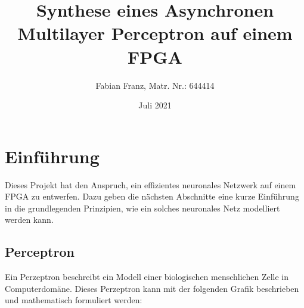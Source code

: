 \documentclass{article}
\title{Synthese eines Asynchronen Multilayer Perceptron auf einem FPGA}
\author{Fabian Franz, Matr. Nr.: 644414}
\date{Juli 2021}
\numberwithin{equation}{section}
\begin{document}
\maketitle

\pagebreak
\tableofcontents
\pagebreak

\section{Einführung}
Dieses Projekt hat den Anspruch, ein effizientes neuronales Netzwerk auf einem FPGA zu
entwerfen. Dazu geben die nächsten Abschnitte eine kurze Einführung in die grundlegenden
Prinzipien, wie ein solches neuronales Netz modelliert werden kann.

\subsection{Perceptron}
Ein Perzeptron beschreibt ein Modell einer biologischen menschlichen Zelle in
Computerdomäne. Dieses Perzeptron kann mit der folgenden Grafik beschrieben und mathematisch
formuliert werden:
\end{document}
